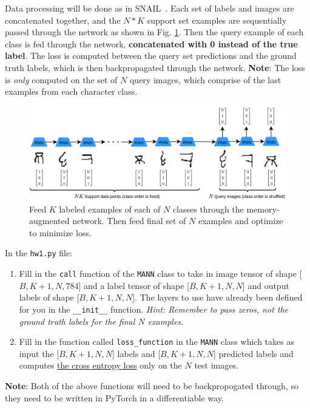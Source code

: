 \documentclass[12pt]{article}
\begin{document}
    Data processing will be done as in SNAIL~\cite{DBLP:journals/corr/MishraRCA17}. Each set of labels and images are concatenated together, and the $N*K$ support set examples are sequentially passed through the network as shown in Fig. \ref{mann}. Then the query example of each class is fed through the network, \textbf{concatenated with 0 instead of the true label}. The loss is computed between the query set predictions and the ground truth labels, which is then backpropagated through the network. \textbf{Note}: The loss is \textit{only} computed on the set of $N$ query images, which comprise of the last examples from each character class.

    \begin{figure}
        \centering
        \includegraphics[width=\linewidth]{figures/hw1seq.png}
        \vspace{-9mm}
        \caption{Feed $K$ labeled examples of each of $N$ classes through the memory-augmented network. Then feed final set of $N$ examples and optimize to minimize loss.}
        \label{mann}
    \end{figure}



    \noindent In the \texttt{hw1.py} file:
    \begin{enumerate}
        \item Fill in the \texttt{call} function of the \texttt{MANN} class to take in image tensor of shape [$B, K+1, N, 784$] and a label tensor of shape [$B, K+1, N, N$] and output labels of shape [$B,K+1,N, N$]. The layers to use have already been defined for you in the \texttt{\_\_init\_\_} function. \textit{Hint: Remember to pass zeros, not the ground truth labels for the final $N$ examples.}
        \item  Fill in the function called \texttt{loss\_function} in the \texttt{MANN} class which takes as input the [$B,K+1,N, N$] labels and [$B,K+1,N, N$] predicted labels and computes \href{https://pytorch.org/docs/stable/generated/torch.nn.functional.cross_entropy.html#torch.nn.functional.cross_entropy}{the cross entropy loss} only on the $N$ test images.
    \end{enumerate}
    \textbf{Note}: Both of the above functions will need to be backpropogated through, so they need to be written in PyTorch in a differentiable way.
\end{document}
